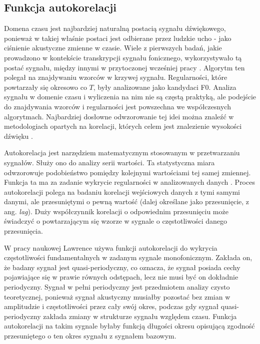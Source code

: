 \documentclass[12pt,a4paper,twoside]{mwart}
\begin{document}
\subsection{Funkcja autokorelacji}\label{sec:f0:ac}
Domena czasu jest najbardziej naturalną postacią sygnału dźwiękowego, ponieważ w takiej właśnie postaci jest odbierane przez ludzkie ucho - jako ciśnienie akustyczne zmienne w czasie. Wiele z pierwszych badań, jakie prowadzono w kontekście transkrypcji sygnału fonicznego, wykorzystywało tą postać sygnału, między innymi w przytoczonej wcześniej pracy \cite{Transcription:Gold:ComputerProgramForPitchExtraction}. Algorytm ten polegał na znajdywaniu wzorców w krzywej sygnału. Regularności, które powtarzały się okresowo co $T$, były analizowane jako kandydaci F0. Analiza sygnału w domenie czasu i wyliczenia na nim nie są częstą praktyką, ale podejście do znajdywania wzorców i regularności jest powszechna we współczesnych algorytmach. Najbardziej dosłowne odwzorowanie tej idei można znaleźć w metodologiach opartych na korelacji, których celem jest znalezienie wysokości dźwięku 
\cite[41-44]{Transcription:Quenneville:Thesis}.

Autokorelacja jest narzędziem matematycznym stosowanym w przetwarzaniu sygnałów. Służy ono do analizy serii wartości. Ta statystyczna miara odwzorowuje podobieństwo pomiędzy kolejnymi wartościami tej samej zmiennej. Funkcja ta ma za zadanie wykrycie regularności w analizowanych danych 
\cite[14-17]{CyfrowePrzetwarzanieSygnalowOdTeoriiDoZastosowan}.
Proces autokorelacji polega na badaniu korelacji wejściowych danych z tymi samymi danymi, ale przesuniętymi o pewną wartość (dalej określane jako przesunięcie, z ang. \textit{lag}). Duży współczynnik korelacji o odpowiednim przesunięciu może świadczyć o powtarzającym się wzorze w sygnale o częstotliwości danego przesunięcia.

W pracy naukowej \cite{Transcription:Lawrence:AutocorrelationForPitchDetection} Lawrence używa funkcji autokorelacji do wykrycia częstotliwości fundamentalnych w zadanym sygnale monofonicznym. Zakłada on, że badany sygnał jest quasi-periodyczny, co oznacza, że sygnał posiada cechy pojawiające się w prawie równych odstępach, lecz nie musi być on dokładnie periodyczny. Sygnał w pełni periodyczny jest przedmiotem analizy czysto teoretycznej, ponieważ sygnał akustyczny musiałby pozostać bez zmian w amplitudzie i częstotliwości przez cały swój okres, podczas gdy sygnał quasi-periodyczny zakłada zmiany w strukturze sygnału względem czasu. Funkcja autokorelacji na takim sygnale byłaby funkcją długości okresu opisującą zgodność przesuniętego o ten okres sygnału z sygnałem bazowym. 
\end{document}
